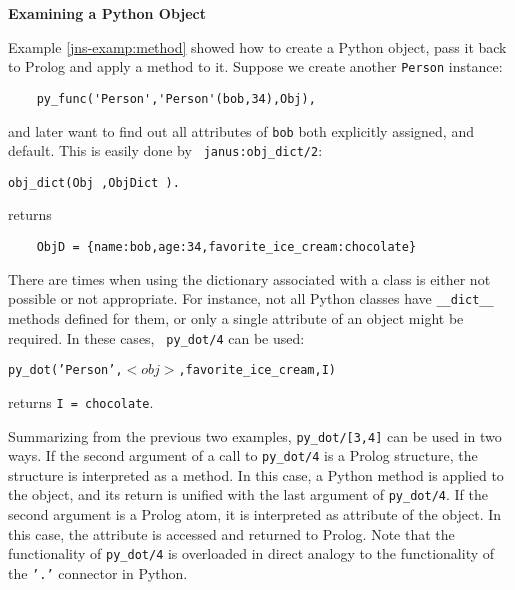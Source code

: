 \begin{example} \rm {\bf Examining a Python Object} \label{jns-examp:exam-object}

\noindent
Example \ref{jns-examp:method} showed how to create a Python object,
pass it back to Prolog and apply a method to it.  Suppose we create
another {\tt Person} instance:

\begin{verbatim}
    py_func('Person','Person'(bob,34),Obj),
\end{verbatim}
\noindent
and later want to find out all attributes of {\tt bob} both explicitly
assigned, and default.  This is easily done by {\tt
  janus:obj\_dict/2}:

{\tt obj\_dict(Obj ,ObjDict ).}

\noindent
returns
\begin{verbatim}
    ObjD = {name:bob,age:34,favorite_ice_cream:chocolate}
\end{verbatim}

There are times when using the dictionary associated with a class is
either not possible or not appropriate.  For instance, not all Python
classes have {\tt \_\_dict\_\_} methods defined for them, or only a
single attribute of an object might be required.  In these cases, {\tt
  py\_dot/4} can be used:

{\tt    py\_dot('Person',$<obj>$,favorite\_ice\_cream,I)}

\noindent
returns {\tt I = chocolate}.

\noindent
Summarizing from the previous two examples, {\tt py\_dot/[3,4]} can be
used in two ways.  If the second argument of a call to {\tt py\_dot/4}
is a Prolog structure, the structure is interpreted as a method.  In
this case, a Python method is applied to the object, and its return is
unified with the last argument of {\tt py\_dot/4}. If the second
argument is a Prolog atom, it is interpreted as attribute of the
object.  In this case, the attribute is accessed and returned to
Prolog.  Note that the functionality of {\tt py\_dot/4} is overloaded
in direct analogy to the functionality of the {\tt '.'} connector in
Python.
\end{example}

